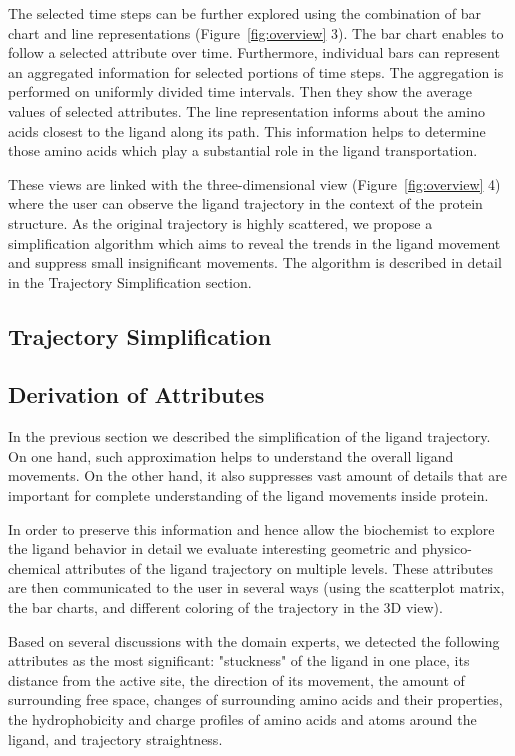 \documentclass[twocolumn]{bmcart}%
\begin{document}
The selected time steps can be further explored using the combination of bar chart and line representations (Figure~\ref{fig:overview} 3). 
The bar chart enables to follow a selected attribute over time.
Furthermore, individual bars can represent an aggregated information for selected portions of time steps.
The aggregation is performed on uniformly divided time intervals.
Then they show the average values of selected attributes.
The line representation informs about the amino acids closest to the ligand along its path.
This information helps to determine those amino acids which play a substantial role in the ligand transportation.

These views are linked with the three-dimensional view (Figure~\ref{fig:overview} 4) where the user can observe the ligand trajectory in the context of the protein structure.
As the original trajectory is highly scattered, we propose a simplification algorithm which aims to reveal the trends in the ligand movement and suppress small insignificant movements.
The algorithm is described in detail in the Trajectory Simplification section.


\subsection*{Trajectory Simplification}


\subsection*{Derivation of Attributes}
In the previous section we described the simplification of the ligand trajectory. 
On one hand, such approximation helps to understand the overall ligand movements. 
On the other hand, it also suppresses vast amount of details that are important for complete understanding of the ligand movements inside protein.

In order to preserve this information and hence allow the biochemist to explore the ligand behavior in detail we evaluate interesting geometric and physico-chemical attributes of the ligand trajectory on multiple levels. 
These attributes are then communicated to the user in several ways (using the scatterplot matrix, the bar charts, and different coloring of the trajectory in the 3D view).

Based on several discussions with the domain experts, we detected the following attributes as the most significant: "stuckness" of the ligand in one place, its distance from the active site, the direction of its movement, the amount of surrounding free space, changes of surrounding amino acids and their properties, the hydrophobicity and charge profiles of amino acids and atoms around the ligand, and trajectory straightness. 
\end{document}
